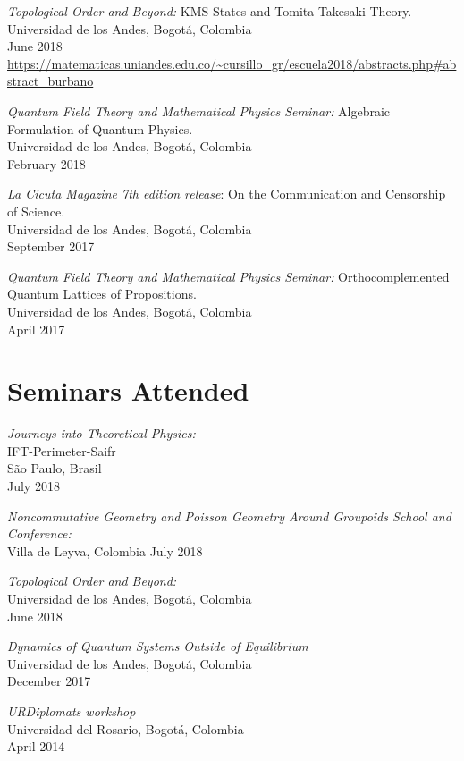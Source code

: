 \documentclass[line,margin]{res}
\begin{document}
\begin{resume}
{\sl Topological Order and Beyond:} KMS States and Tomita-Takesaki Theory.\\
Universidad de los Andes, Bogotá, Colombia\\
June 2018\\
\url{https://matematicas.uniandes.edu.co/~cursillo_gr/escuela2018/abstracts.php#abstract_burbano}

{\sl Quantum Field Theory and Mathematical Physics Seminar:} Algebraic Formulation of Quantum Physics.\\
Universidad de los Andes, Bogotá, Colombia\\
February 2018

{\sl La Cicuta Magazine 7th edition release}: On the Communication and Censorship of Science.\\
Universidad de los Andes, Bogotá, Colombia\\
September 2017

{\sl Quantum Field Theory and Mathematical Physics Seminar:} Orthocomplemented Quantum Lattices of Propositions.\\
Universidad de los Andes, Bogotá, Colombia\\
April 2017
  
  
\section{Seminars Attended}

{\sl Journeys into Theoretical Physics:}\\
IFT-Perimeter-Saifr\\
São Paulo, Brasil\\
July 2018

{\sl Noncommutative Geometry and Poisson Geometry Around Groupoids School and Conference:}\\
Villa de Leyva, Colombia
July 2018

{\sl Topological Order and Beyond:}\\
Universidad de los Andes, Bogotá, Colombia\\
June 2018

{\sl Dynamics of Quantum Systems Outside of Equilibrium} \\
Universidad de los Andes, Bogotá, Colombia\\
December 2017

{\sl URDiplomats workshop} \\
Universidad del Rosario, Bogotá, Colombia \\
April 2014  
 

\end{resume}
\end{document}
